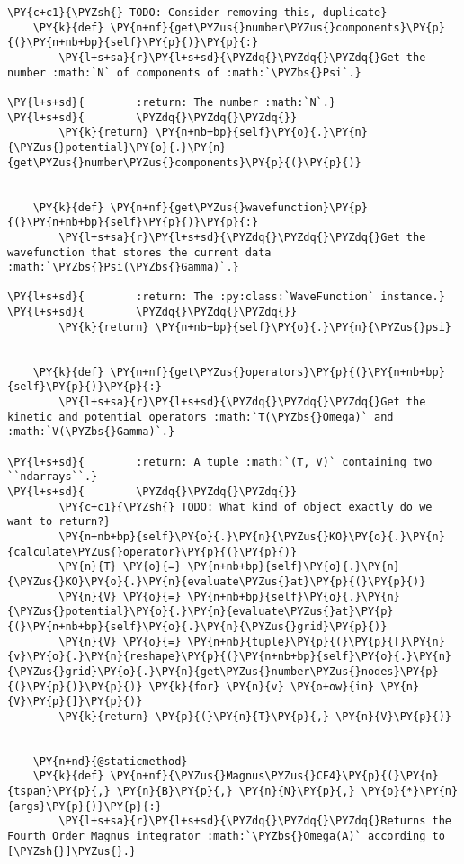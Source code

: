 \begin{Verbatim}[commandchars=\\\{\}]
    \PY{c+c1}{\PYZsh{} TODO: Consider removing this, duplicate}
    \PY{k}{def} \PY{n+nf}{get\PYZus{}number\PYZus{}components}\PY{p}{(}\PY{n+nb+bp}{self}\PY{p}{)}\PY{p}{:}
        \PY{l+s+sa}{r}\PY{l+s+sd}{\PYZdq{}\PYZdq{}\PYZdq{}Get the number :math:`N` of components of :math:`\PYZbs{}Psi`.}

\PY{l+s+sd}{        :return: The number :math:`N`.}
\PY{l+s+sd}{        \PYZdq{}\PYZdq{}\PYZdq{}}
        \PY{k}{return} \PY{n+nb+bp}{self}\PY{o}{.}\PY{n}{\PYZus{}potential}\PY{o}{.}\PY{n}{get\PYZus{}number\PYZus{}components}\PY{p}{(}\PY{p}{)}


    \PY{k}{def} \PY{n+nf}{get\PYZus{}wavefunction}\PY{p}{(}\PY{n+nb+bp}{self}\PY{p}{)}\PY{p}{:}
        \PY{l+s+sa}{r}\PY{l+s+sd}{\PYZdq{}\PYZdq{}\PYZdq{}Get the wavefunction that stores the current data :math:`\PYZbs{}Psi(\PYZbs{}Gamma)`.}

\PY{l+s+sd}{        :return: The :py:class:`WaveFunction` instance.}
\PY{l+s+sd}{        \PYZdq{}\PYZdq{}\PYZdq{}}
        \PY{k}{return} \PY{n+nb+bp}{self}\PY{o}{.}\PY{n}{\PYZus{}psi}


    \PY{k}{def} \PY{n+nf}{get\PYZus{}operators}\PY{p}{(}\PY{n+nb+bp}{self}\PY{p}{)}\PY{p}{:}
        \PY{l+s+sa}{r}\PY{l+s+sd}{\PYZdq{}\PYZdq{}\PYZdq{}Get the kinetic and potential operators :math:`T(\PYZbs{}Omega)` and :math:`V(\PYZbs{}Gamma)`.}

\PY{l+s+sd}{        :return: A tuple :math:`(T, V)` containing two ``ndarrays``.}
\PY{l+s+sd}{        \PYZdq{}\PYZdq{}\PYZdq{}}
        \PY{c+c1}{\PYZsh{} TODO: What kind of object exactly do we want to return?}
        \PY{n+nb+bp}{self}\PY{o}{.}\PY{n}{\PYZus{}KO}\PY{o}{.}\PY{n}{calculate\PYZus{}operator}\PY{p}{(}\PY{p}{)}
        \PY{n}{T} \PY{o}{=} \PY{n+nb+bp}{self}\PY{o}{.}\PY{n}{\PYZus{}KO}\PY{o}{.}\PY{n}{evaluate\PYZus{}at}\PY{p}{(}\PY{p}{)}
        \PY{n}{V} \PY{o}{=} \PY{n+nb+bp}{self}\PY{o}{.}\PY{n}{\PYZus{}potential}\PY{o}{.}\PY{n}{evaluate\PYZus{}at}\PY{p}{(}\PY{n+nb+bp}{self}\PY{o}{.}\PY{n}{\PYZus{}grid}\PY{p}{)}
        \PY{n}{V} \PY{o}{=} \PY{n+nb}{tuple}\PY{p}{(}\PY{p}{[}\PY{n}{v}\PY{o}{.}\PY{n}{reshape}\PY{p}{(}\PY{n+nb+bp}{self}\PY{o}{.}\PY{n}{\PYZus{}grid}\PY{o}{.}\PY{n}{get\PYZus{}number\PYZus{}nodes}\PY{p}{(}\PY{p}{)}\PY{p}{)} \PY{k}{for} \PY{n}{v} \PY{o+ow}{in} \PY{n}{V}\PY{p}{]}\PY{p}{)}
        \PY{k}{return} \PY{p}{(}\PY{n}{T}\PY{p}{,} \PY{n}{V}\PY{p}{)}


    \PY{n+nd}{@staticmethod}
    \PY{k}{def} \PY{n+nf}{\PYZus{}Magnus\PYZus{}CF4}\PY{p}{(}\PY{n}{tspan}\PY{p}{,} \PY{n}{B}\PY{p}{,} \PY{n}{N}\PY{p}{,} \PY{o}{*}\PY{n}{args}\PY{p}{)}\PY{p}{:}
        \PY{l+s+sa}{r}\PY{l+s+sd}{\PYZdq{}\PYZdq{}\PYZdq{}Returns the  Fourth Order Magnus integrator :math:`\PYZbs{}Omega(A)` according to [\PYZsh{}]\PYZus{}.}


\end{Verbatim}
